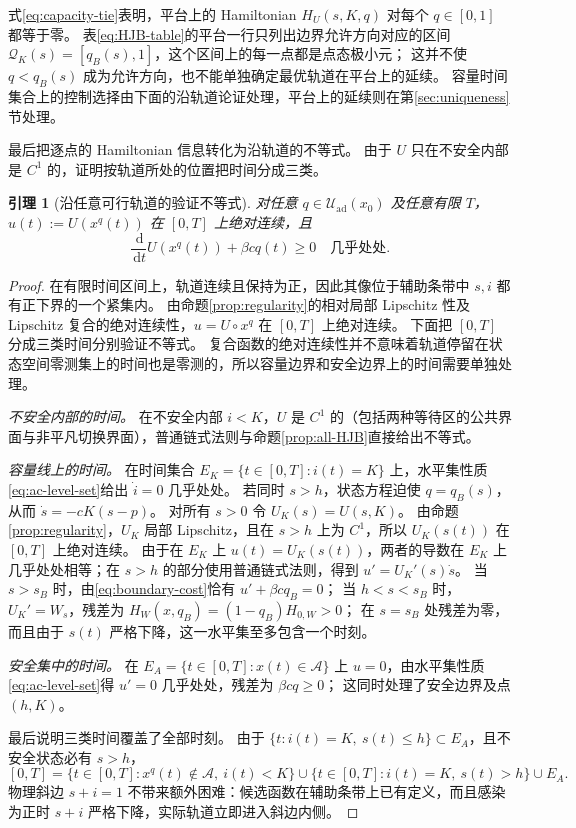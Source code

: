 \documentclass[11pt,a4paper,UTF8]{ctexart}
\newtheorem{lemma}[theorem]{引理}
\theoremstyle{definition}
\newcommand{\Acal}{\mathcal A}
\newcommand{\Uad}{\mathcal U_{\mathrm{ad}}}
\newcommand{\dd}{\,\mathrm d}
\begin{document}
式\eqref{eq:capacity-tie}表明，平台上的 Hamiltonian $H_U(s,K,q)$ 对每个 $q\in[0,1]$ 都等于零。
表\eqref{eq:HJB-table}的平台一行只列出边界允许方向对应的区间 $\mathcal Q_K(s)=[q_B(s),1]$，这个区间上的每一点都是点态极小元；
这并不使 $q<q_B(s)$ 成为允许方向，也不能单独确定最优轨道在平台上的延续。
容量时间集合上的控制选择由下面的沿轨道论证处理，平台上的延续则在第\ref{sec:uniqueness}节处理。

最后把逐点的 Hamiltonian 信息转化为沿轨道的不等式。
由于 $U$ 只在不安全内部是 $C^1$ 的，证明按轨道所处的位置把时间分成三类。

\begin{lemma}[沿任意可行轨道的验证不等式]
\label{lem:trajectory-verification}
对任意 $q\in\Uad(x_0)$ 及任意有限 $T$，$u(t):=U(x^q(t))$ 在 $[0,T]$ 上绝对连续，且
\begin{equation}
\frac{\dd}{\dd t}U(x^q(t))+\beta cq(t)\ge0\quad\text{几乎处处}.
\label{eq:verification-ineq}
\end{equation}
\end{lemma}
\begin{proof}
在有限时间区间上，轨道连续且保持为正，因此其像位于辅助条带中 $s,i$ 都有正下界的一个紧集内。
由命题\ref{prop:regularity}的相对局部 Lipschitz 性及 Lipschitz 复合的绝对连续性，$u=U\circ x^q$ 在 $[0,T]$ 上绝对连续。
下面把 $[0,T]$ 分成三类时间分别验证不等式。
复合函数的绝对连续性并不意味着轨道停留在状态空间零测集上的时间也是零测的，所以容量边界和安全边界上的时间需要单独处理。

\emph{不安全内部的时间。}
在不安全内部 $i<K$，$U$ 是 $C^1$ 的（包括两种等待区的公共界面与非平凡切换界面），普通链式法则与命题\ref{prop:all-HJB}直接给出不等式。

\emph{容量线上的时间。}
在时间集合 $E_K=\{t\in[0,T]:i(t)=K\}$ 上，水平集性质\eqref{eq:ac-level-set}给出 $\dot i=0$ 几乎处处。
若同时 $s>h$，状态方程迫使 $q=q_B(s)$，从而 $\dot s=-cK(s-p)$。
对所有 $s>0$ 令 $U_K(s)=U(s,K)$。
由命题\ref{prop:regularity}，$U_K$ 局部 Lipschitz，且在 $s>h$ 上为 $C^1$，所以 $U_K(s(t))$ 在 $[0,T]$ 上绝对连续。
由于在 $E_K$ 上 $u(t)=U_K(s(t))$，两者的导数在 $E_K$ 上几乎处处相等；在 $s>h$ 的部分使用普通链式法则，得到 $u'=U_K'(s)\dot s$。
当 $s>s_B$ 时，由\eqref{eq:boundary-cost}恰有 $u'+\beta cq_B=0$；
当 $h<s<s_B$ 时，$U_K'=W_s$，残差为 $H_W(x,q_B)=(1-q_B)H_{0,W}>0$；
在 $s=s_B$ 处残差为零，而且由于 $s(t)$ 严格下降，这一水平集至多包含一个时刻。

\emph{安全集中的时间。}
在 $E_A=\{t\in[0,T]:x(t)\in\Acal\}$ 上 $u=0$，由水平集性质\eqref{eq:ac-level-set}得 $u'=0$ 几乎处处，残差为 $\beta cq\ge0$；
这同时处理了安全边界及点 $(h,K)$。

最后说明三类时间覆盖了全部时刻。
由于 $\{t:i(t)=K,\ s(t)\le h\}\subset E_A$，且不安全状态必有 $s>h$，
\[
[0,T]
=\{t\in[0,T]:x^q(t)\notin\Acal,\ i(t)<K\}
\cup\{t\in[0,T]:i(t)=K,\ s(t)>h\}
\cup E_A.
\]
物理斜边 $s+i=1$ 不带来额外困难：候选函数在辅助条带上已有定义，而且感染为正时 $s+i$ 严格下降，实际轨道立即进入斜边内侧。
\end{proof}
\end{document}
